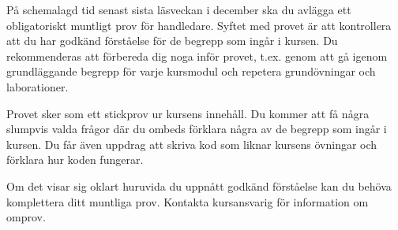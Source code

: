 På schemalagd tid senast sista läsveckan i december ska du avlägga ett obligatoriskt muntligt prov för handledare. Syftet med provet är att kontrollera att du har godkänd förståelse för de begrepp som ingår i kursen. Du rekommenderas att förbereda dig noga inför provet, t.ex. genom att gå igenom grundläggande begrepp för varje kursmodul och repetera grundövningar och laborationer.

Provet sker som ett stickprov ur kursens innehåll. Du kommer att få några slumpvis valda frågor där du ombeds förklara några av de begrepp som ingår i kursen. Du får även uppdrag att skriva kod som liknar kursens övningar och förklara hur koden fungerar. 

Om det visar sig oklart huruvida du uppnått godkänd förståelse kan du behöva komplettera ditt muntliga prov. Kontakta kursansvarig för information om omprov.  

